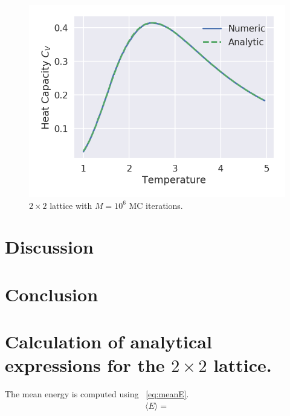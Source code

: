 \documentclass[aps,reprint]{revtex4-1}
\newcommand\blankpage{%
  \null
  \thispagestyle{empty}%
  \addtocounter{page}{-1}%
  \newpage}
\newcommand{\mean}[1]{\langle #1 \rangle}
\begin{document}
\begin{figure}[H]
  \centering
  \includegraphics[width=\columnwidth]{figures/L2Ne6.png}
  \caption{$2 \times 2$ lattice with $M = 10^6$ MC iterations.}
  \label{fig:L2Ne6}
\end{figure}

\section{Discussion} \label{sec:discussion}

\section{Conclusion} \label{sec:conclusion}


\blankpage
\appendix
\section{Calculation of analytical expressions for the $2\times2$ lattice.} \label{sec:app}
The mean energy is computed using ~\ref{eq:meanE}.
\begin{align*}
  \mean{E} =
\end{align*}
\blankpage
\end{document}
